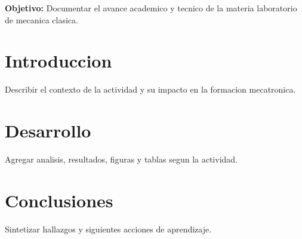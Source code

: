 \documentclass[spanish,letterpaper,oneside]{article}
\begin{document}
\templatePortrait
\templatePagecfg
\onehalfspacing

\begin{abstractd}
\textbf{Objetivo:} Documentar el avance academico y tecnico de la materia laboratorio de mecanica clasica.
\end{abstractd}

\templateIndex
\templateFinalcfg

\section{Introduccion}
Describir el contexto de la actividad y su impacto en la formacion mecatronica.

\section{Desarrollo}
Agregar analisis, resultados, figuras y tablas segun la actividad.

\section{Conclusiones}
Sintetizar hallazgos y siguientes acciones de aprendizaje.



\end{document}
